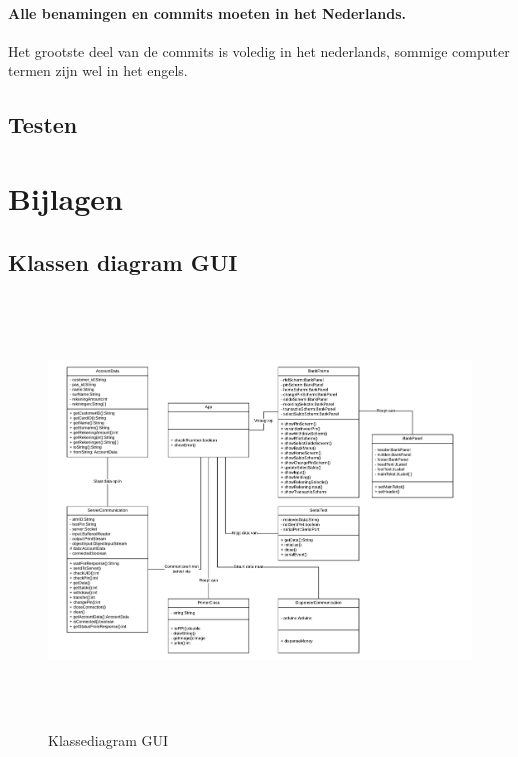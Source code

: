 \documentclass{article}
\begin{document}
\paragraph{Alle benamingen en commits moeten in het Nederlands.}
Het grootste deel van de commits is voledig in het nederlands, sommige computer termen zijn wel in het engels.

\subsection{Testen}


\newpage
\section{Bijlagen}

\subsection{Klassen diagram GUI}
\begin{figure}[H]
       \centering
       \includegraphics[height=4.5in]{Klassediagram.pdf}
       \caption{Klassediagram GUI}
       \label{fig: Klassediagram GUI}
\end{figure}
\end{document}
